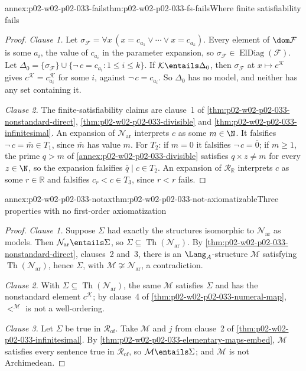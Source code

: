 \begin{annexitem}{annex:p02-w02-p02-033-fails}{thm:p02-w02-p02-033-fs-fails}{Where finite satisfiability fails}
\begin{proof}
\emph{Clause 1.}  Let
\(\sigma_{\mathcal F}=\forall x\,(x=c_{a_1}\lor\cdots\lor x=c_{a_k})\).  Every
element of \(\dom\mathcal F\) is some \(a_i\), the value of \(c_{a_i}\) in
the parameter expansion, so \(\sigma_{\mathcal F}\in
\operatorname{ElDiag}(\mathcal F)\).  Let
\(\Delta_0=\{\sigma_{\mathcal F}\}\cup\{\neg\,c=c_{a_i}:1\leq i\leq k\}\).  If
\(\mathcal K\entails\Delta_0\), then \(\sigma_{\mathcal F}\) at
\(x\mapsto c^{\mathcal K}\) gives \(c^{\mathcal K}=c_{a_i}^{\mathcal K}\) for
some \(i\), against \(\neg\,c=c_{a_i}\).  So \(\Delta_0\) has no model, and
neither has any set containing it.

\emph{Clause 2.}  The finite-satisfiability claims are clause~1 of
\cref{thm:p02-w02-p02-033-nonstandard-direct},
\cref{thm:p02-w02-p02-033-divisible} and
\cref{thm:p02-w02-p02-033-infinitesimal}.  An expansion of
\(\mathcal N_{\mathrm{ar}}\) interprets \(c\) as some \(m\in\N\).  It
falsifies \(\neg\,c=\bar m\in T_1\), since \(\bar m\) has value \(m\).  For
\(T_2\): if \(m=0\) it falsifies \(\neg\,c=\bar 0\); if \(m\geq1\), the
prime \(q>m\) of \cref{annex:p02-w02-p02-033-divisible} satisfies
\(q\times z\ne m\) for every \(z\in\N\), so the expansion falsifies
\(\bar q\mid c\in T_2\).  An expansion of \(\mathcal R_{\mathbb R}\)
interprets \(c\) as some \(r\in\mathbb R\) and falsifies \(c_r<c\in T_3\),
since \(r<r\) fails.
\end{proof}
\end{annexitem}

\begin{annexitem}{annex:p02-w02-p02-033-notax}{thm:p02-w02-p02-033-not-axiomatizable}{Three properties with no first-order axiomatization}
\begin{proof}
\emph{Clause 1.}  Suppose \(\Sigma\) had exactly the structures isomorphic
to \(\mathcal N_{\mathrm{ar}}\) as models.  Then
\(\mathcal N_{\mathrm{ar}}\entails\Sigma\), so
\(\Sigma\subseteq\operatorname{Th}(\mathcal N_{\mathrm{ar}})\).  By
\cref{thm:p02-w02-p02-033-nonstandard-direct}, clauses~2 and~3, there is an
\(\Lang_A\)-structure \(\mathcal M\) satisfying
\(\operatorname{Th}(\mathcal N_{\mathrm{ar}})\), hence \(\Sigma\), with
\(\mathcal M\not\cong\mathcal N_{\mathrm{ar}}\), a contradiction.

\emph{Clause 2.}  With \(\Sigma\subseteq\operatorname{Th}(\mathcal N_{\mathrm{ar}})\),
the same \(\mathcal M\) satisfies \(\Sigma\) and has the nonstandard element
\(c^{\mathcal K}\); by clause~4 of \cref{thm:p02-w02-p02-033-numeral-map},
\(<^{\mathcal M}\) is not a well-ordering.

\emph{Clause 3.}  Let \(\Sigma\) be true in \(\mathcal R_{\mathrm{of}}\).
Take \(\mathcal M\) and \(j\) from clause~2 of
\cref{thm:p02-w02-p02-033-infinitesimal}.  By
\cref{thm:p02-w02-p02-033-elementary-maps-embed}, \(\mathcal M\) satisfies
every sentence true in \(\mathcal R_{\mathrm{of}}\), so
\(\mathcal M\entails\Sigma\); and \(\mathcal M\) is not Archimedean.
\end{proof}
\end{annexitem}

